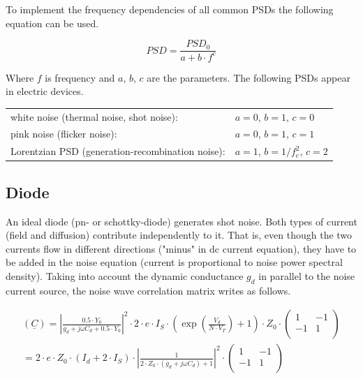 To implement the frequency dependencies of all common PSDs the
following equation can be used.

\begin{equation}
PSD = \frac{PSD_0}{a+b\cdot f^c}
\end{equation}

Where $f$ is frequency and $a$, $b$, $c$ are the parameters.  The
following PSDs appear in electric devices.

\addvspace{12pt}

\begin{tabular}{ll}
white noise (thermal noise, shot noise):         & $a=0$, $b=1$, $c=0$ \\
pink noise (flicker noise):                      & $a=0$, $b=1$, $c=1$ \\
Lorentzian PSD (generation-recombination noise): & $a=1$, $b=1/f_c^2$, $c=2$ \\
\end{tabular}


\subsection{Diode}
\label{sec:nw_diode}

An ideal diode (pn- or schottky-diode) generates shot noise.  Both
types of current (field and diffusion) contribute independently to it.
That is, even though the two currents flow in different directions
("minus" in dc current equation), they have to be added in the noise
equation (current is proportional to noise power spectral density).
Taking into account the dynamic conductance $g_d$ in parallel to the
noise current source, the noise wave correlation matrix writes as
follows.

\begin{equation}
\begin{split}
(\underline{C})
 =  \left| \frac{0.5\cdot Y_0}{g_d+j\omega C_d + 0.5\cdot Y_0}\right|^2  \cdot 2\cdot e\cdot I_S\cdot
    \left( \exp\left( \frac{V_{d}}{N\cdot V_T} \right) +1 \right) \cdot Z_0\cdot\begin{pmatrix}
   1 & -1\\
  -1 &  1\\
\end{pmatrix} \\
 = 2\cdot e\cdot Z_0\cdot \left(I_{d} + 2\cdot I_{S}\right)\cdot
    \left| \frac{1}{2\cdot Z_0\cdot (g_d+j\omega C_d) + 1}\right|^2 \cdot
\begin{pmatrix}
   1 & -1\\
  -1 &  1\\
\end{pmatrix}
\end{split}
\end{equation}

